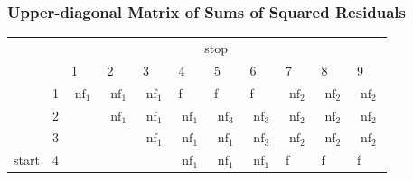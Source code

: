 \documentclass[presentation.tex]{subfiles}
\begin{document}
\begin{frame}[fragile]
  \frametitle{Upper-diagonal Matrix of Sums of Squared Residuals}
\begin{table}[]
\begin{tabular}{lllllllllll}
                                   & \multicolumn{10}{c}{stop}                                                                                                                                                                                                                                                 \\ \cline{2-11} 
\multicolumn{1}{l|}{}              & \multicolumn{1}{l|}{}  & \multicolumn{1}{l|}{1}    & \multicolumn{1}{l|}{2}    & \multicolumn{1}{l|}{3}    & \multicolumn{1}{l|}{4}    & \multicolumn{1}{l|}{5}    & \multicolumn{1}{l|}{6}    & \multicolumn{1}{l|}{7}    & \multicolumn{1}{l|}{8}    & \multicolumn{1}{l|}{9}    \\ \cline{2-11} 
\multicolumn{1}{l|}{}              & \multicolumn{1}{l|}{1} & \multicolumn{1}{l|}{$\operatorname{nf}_1$} & \multicolumn{1}{l|}{$\operatorname{nf}_1$} & \multicolumn{1}{l|}{$\operatorname{nf}_1$} & \multicolumn{1}{l|}{f}   & \multicolumn{1}{l|}{f}   & \multicolumn{1}{l|}{f}   & \multicolumn{1}{l|}{$\operatorname{nf}_2$} & \multicolumn{1}{l|}{$\operatorname{nf}_2$} & \multicolumn{1}{l|}{$\operatorname{nf}_2$} \\ \cline{2-11} 
\multicolumn{1}{l|}{}              & \multicolumn{1}{l|}{2} & \multicolumn{1}{l|}{}     & \multicolumn{1}{l|}{$\operatorname{nf}_1$} & \multicolumn{1}{l|}{$\operatorname{nf}_1$} & \multicolumn{1}{l|}{$\operatorname{nf}_1$} & \multicolumn{1}{l|}{$\operatorname{nf}_3$} & \multicolumn{1}{l|}{$\operatorname{nf}_3$} & \multicolumn{1}{l|}{$\operatorname{nf}_2$} & \multicolumn{1}{l|}{$\operatorname{nf}_2$} & \multicolumn{1}{l|}{$\operatorname{nf}_2$} \\ \cline{2-11} 
\multicolumn{1}{l|}{}              & \multicolumn{1}{l|}{3} & \multicolumn{1}{l|}{}     & \multicolumn{1}{l|}{}     & \multicolumn{1}{l|}{$\operatorname{nf}_1$} & \multicolumn{1}{l|}{$\operatorname{nf}_1$} & \multicolumn{1}{l|}{$\operatorname{nf}_1$} & \multicolumn{1}{l|}{$\operatorname{nf}_3$} & \multicolumn{1}{l|}{$\operatorname{nf}_2$} & \multicolumn{1}{l|}{$\operatorname{nf}_2$} & \multicolumn{1}{l|}{$\operatorname{nf}_2$} \\ \cline{2-11} 
\multicolumn{1}{l|}{start} & \multicolumn{1}{l|}{4} & \multicolumn{1}{l|}{}     & \multicolumn{1}{l|}{}     & \multicolumn{1}{l|}{}     & \multicolumn{1}{l|}{$\operatorname{nf}_1$} & \multicolumn{1}{l|}{$\operatorname{nf}_1$} & \multicolumn{1}{l|}{$\operatorname{nf}_1$} & \multicolumn{1}{l|}{f}   & \multicolumn{1}{l|}{f}   & \multicolumn{1}{l|}{f}   \\ \cline{2-11} 

\end{tabular}
\end{table}
\end{frame}
\end{document}
